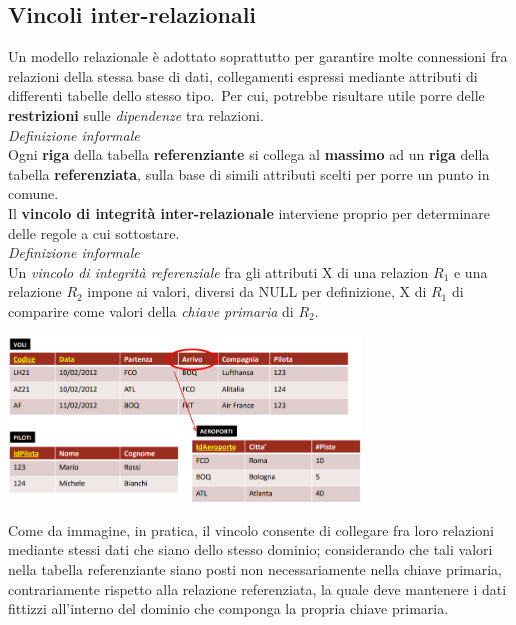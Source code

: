 \documentclass{article}
\begin{document}
\subsection*{Vincoli inter-relazionali}
\large
Un modello relazionale è adottato soprattutto per garantire molte connessioni fra relazioni della stessa base di dati, collegamenti espressi mediante attributi di differenti tabelle dello stesso tipo.\ Per cui, potrebbe risultare utile porre delle \textbf{restrizioni} sulle \textit{dipendenze} tra relazioni.\vspace{14pt}\\
\textit{Definizione informale}\\Ogni \textbf{riga} della tabella \textbf{referenziante} si collega al \textbf{massimo} ad un \textbf{riga} della tabella \textbf{referenziata}, sulla base di simili attributi scelti per porre un punto in comune.\vspace{14pt}\\
Il \textbf{vincolo di integrità inter-relazionale} interviene proprio per determinare delle regole a cui sottostare.\vspace{14pt}\\
\textit{Definizione informale}\\Un \textit{vincolo di integrità referenziale} fra gli attributi X di una relazion $R_1$ e una relazione $R_2$ impone ai valori, diversi da NULL per definizione, X di $R_1$ di comparire come valori della \textit{chiave primaria} di $R_2$.
\begin{center}
    \includegraphics[width = 0.7\textwidth]{foto 5.png}
\end{center}
Come da immagine, in pratica, il vincolo consente di collegare fra loro relazioni mediante stessi dati che siano dello stesso dominio; considerando che tali valori nella tabella referenziante siano posti non necessariamente nella chiave primaria, contrariamente rispetto alla relazione referenziata, la quale deve mantenere i dati fittizzi all'interno del dominio che componga la propria chiave primaria.\vspace{14pt}\\
\end{document}
